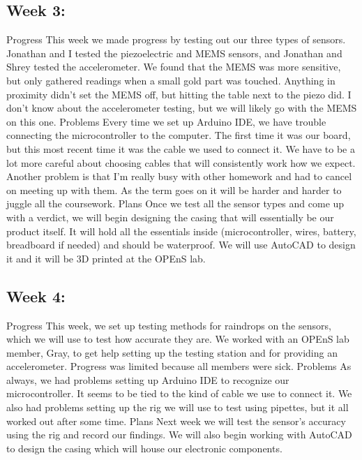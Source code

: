 \documentclass[letterpaper,10pt,draftclsnofoot,onecolumn]{article}
\begin{document}
\subsection{Week 3:}
Progress
This week we made progress by testing out our three types of sensors. Jonathan and I tested the piezoelectric and MEMS sensors, and Jonathan and Shrey tested the accelerometer. We found that the MEMS was more sensitive, but only gathered readings when a small gold part was touched. Anything in proximity didn't set the MEMS off, but hitting the table next to the piezo did. I don't know about the accelerometer testing, but we will likely go with the MEMS on this one.
\newline
Problems
Every time we set up Arduino IDE, we have trouble connecting the microcontroller to the computer. The first time it was our board, but this most recent time it was the cable we used to connect it. We have to be a lot more careful about choosing cables that will consistently work how we expect. Another problem is that I'm really busy with other homework and had to cancel on meeting up with them. As the term goes on it will be harder and harder to juggle all the coursework.
\newline
Plans
Once we test all the sensor types and come up with a verdict, we will begin designing the casing that will essentially be our product itself. It will hold all the essentials inside (microcontroller, wires, battery, breadboard if needed) and should be waterproof. We will use AutoCAD to design it and it will be 3D printed at the OPEnS lab.
 
 
\subsection{Week 4:}
Progress
This week, we set up testing methods for raindrops on the sensors, which we will use to test how accurate they are. We worked with an OPEnS lab member, Gray, to get help setting up the testing station and for providing an accelerometer. Progress was limited because all members were sick.
\newline
Problems
As always, we had problems setting up Arduino IDE to recognize our microcontroller. It seems to be tied to the kind of cable we use to connect it. We also had problems setting up the rig we will use to test using pipettes, but it all worked out after some time.
\newline
Plans
Next week we will test the sensor's accuracy using the rig and record our findings. We will also begin working with AutoCAD to design the casing which will house our electronic components.
 
\end{document}
